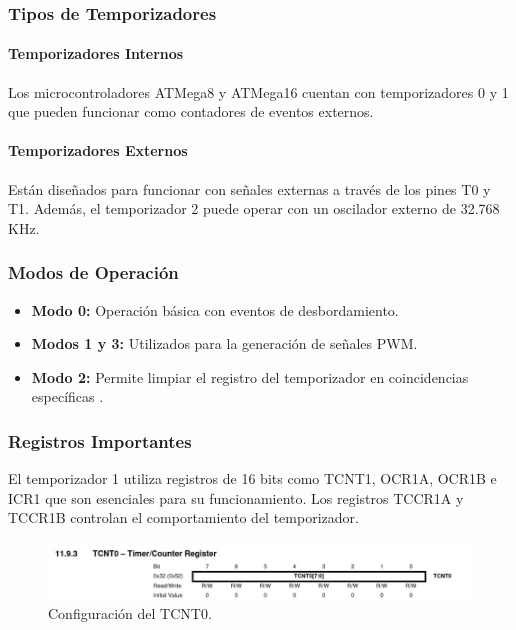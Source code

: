 \subsubsection{Tipos de Temporizadores}

\paragraph{Temporizadores Internos}
Los microcontroladores ATMega8 y ATMega16 cuentan con temporizadores 0 y 1 que pueden funcionar como contadores de eventos externos.

\paragraph{Temporizadores Externos}
Están diseñados para funcionar con señales externas a través de los pines T0 y T1. Además, el temporizador 2 puede operar con un oscilador externo de 32.768 KHz.

\subsubsection{Modos de Operación}

\begin{itemize}
    \item \textbf{Modo 0:} Operación básica con eventos de desbordamiento.
    \item \textbf{Modos 1 y 3:} Utilizados para la generación de señales PWM.
    \item \textbf{Modo 2:} Permite limpiar el registro del temporizador en coincidencias específicas \cite{interrupciones}.
\end{itemize}

\subsubsection{Registros Importantes}
El temporizador 1 utiliza registros de 16 bits como TCNT1, OCR1A, OCR1B e ICR1 que son esenciales para su funcionamiento. Los registros TCCR1A y TCCR1B controlan el comportamiento del temporizador.
\begin{figure}[H]
    \centering
    \includegraphics[scale=0.5]{images/TCNT0.jpeg}
    \caption{Configuración del TCNT0\cite{Atmel2011}.}
    \label{fig:enter-label}
\end{figure}

